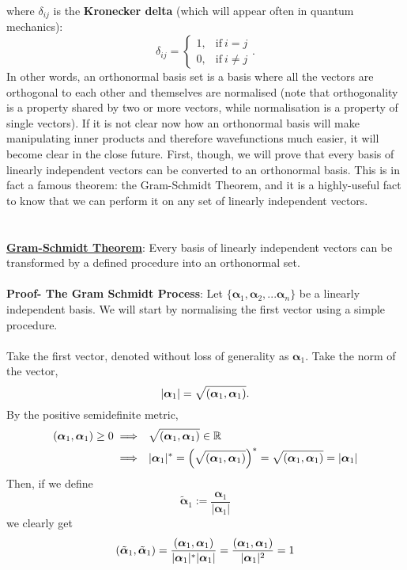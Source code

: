 where $\delta_{ij}$ is the \textbf{Kronecker delta} (which will appear often in quantum mechanics): 
$$
\delta_{ij}=
\begin{cases}
1, &\text{if}\ i=j\\
0, &\text{if}\ i \neq j
\end{cases}.
$$
In other words, an orthonormal basis set is a basis where all the vectors are orthogonal to each other and themselves are normalised (note that orthogonality is a property shared by two or more vectors, while normalisation is a property of single vectors). If it is not clear now how an orthonormal basis will make manipulating inner products and therefore wavefunctions much easier, it will become clear in the close future. First, though, we will prove that every basis of linearly independent vectors can be converted to an orthonormal basis. This is in fact a famous theorem: the Gram-Schmidt Theorem, and it is a highly-useful fact to know that we can perform it on any set of linearly independent vectors.
\\\\\\
\underline{\textbf{Gram-Schmidt Theorem}}: Every basis of linearly independent vectors can be transformed by a defined procedure into an orthonormal set.
\\\\
\textbf{Proof- The Gram Schmidt Process}: Let $\{\bm{\alpha}_{1},\bm{\alpha}_{2},... \bm{\alpha}_{n}\}$ be a linearly independent basis. We will start by normalising the first vector using a simple procedure. 
\\\\
Take the first vector, denoted without loss of generality as $\bm{\alpha}_{1}$. Take the norm of the vector,
$$
|\bm{\alpha}_{1}|=\sqrt{\left(\bm{\alpha}_{1},\bm{\alpha}_{1}\right)}.
$$
By the positive semidefinite metric,
$$
\begin{aligned}
\left(\bm{\alpha}_{1},\bm{\alpha}_{1}\right) \geq 0 &\implies \:\: \sqrt{\left(\bm{\alpha}_{1},\bm{\alpha}_{1}\right)} \in \mathbb{R}\\
&\implies \:\: |\bm{\alpha}_1|^{\ast}=\left(\sqrt{\left(\bm{\alpha}_{1},\bm{\alpha}_{1}\right)}\right)^{\ast}= \sqrt{\left(\bm{\alpha}_{1},\bm{\alpha}_{1}\right)} =|\bm{\alpha}_1|
\end{aligned}
$$
Then, if we define
$$
\tilde{\bm{\alpha}}_{1} := \frac{\bm{\alpha}_{1}}{|\bm{\alpha}_{1}|}
$$
we clearly get
$$
\left(\tilde{\bm{\alpha}}_{1},\tilde{\bm{\alpha}}_{1}\right) = \frac{\left({\bm{\alpha}}_{1},{\bm{\alpha}}_{1}\right)}{|\bm{\alpha}_{1}|^{\ast}|\bm{\alpha}_{1}|}=\frac{\left({\bm{\alpha}}_{1},{\bm{\alpha}}_{1}\right)}{|\bm{\alpha}_{1}|^{2}}=1
$$
